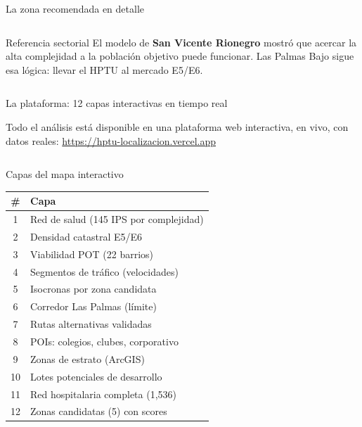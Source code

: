 \documentclass[aspectratio=169, 11pt]{beamer}
\begin{document}
\begin{frame}{La zona recomendada en detalle}
\begin{columns}[T]
\vspace{2pt}
\begin{block}{\small Referencia sectorial}
\scriptsize El modelo de \textbf{San Vicente Rionegro} mostró que acercar la alta complejidad a la población objetivo puede funcionar. Las Palmas Bajo sigue esa lógica: llevar el HPTU al mercado E5/E6.
\end{block}
\end{columns}
\end{frame}

{
\begin{frame}{La plataforma: 12 capas interactivas en tiempo real}

{\small Todo el análisis está disponible en una plataforma web interactiva, en vivo, con datos reales: {\textcolor{hptu}{\url{https://hptu-localizacion.vercel.app}}}}

\vspace{4pt}
\begin{columns}[T]

\begin{block}{\small Capas del mapa interactivo}
\scriptsize
\begin{tabular}{@{}cl@{}}
\toprule
\textbf{\#} & \textbf{Capa} \\
\midrule
1 & Red de salud (145 IPS por complejidad) \\
2 & Densidad catastral E5/E6 \\
3 & Viabilidad POT (22 barrios) \\
4 & Segmentos de tráfico (velocidades) \\
5 & Isocronas por zona candidata \\
6 & Corredor Las Palmas (límite) \\
7 & Rutas alternativas validadas \\
8 & POIs: colegios, clubes, corporativo \\
9 & Zonas de estrato (ArcGIS) \\
10 & Lotes potenciales de desarrollo \\
11 & Red hospitalaria completa (1,536) \\
12 & Zonas candidatas (5) con scores \\
\bottomrule
\end{tabular}
\end{block}


\end{columns}
\end{frame}}
\end{document}
